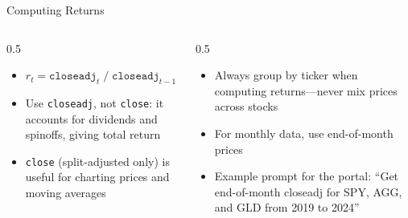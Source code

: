 \documentclass[aspectratio=169]{beamer}
\begin{document}
\begin{frame}{Computing Returns}
\begin{columns}[T]
\begin{column}{0.5\textwidth}
\begin{shadedbox}[title=\textbf{Monthly Returns from \texttt{closeadj}}]
\begin{itemize}\small
  \item $r_t = \texttt{closeadj}_t \;/\; \texttt{closeadj}_{t-1} - 1$
  \item Use \texttt{closeadj}, not \texttt{close}: it accounts for dividends and spinoffs, giving \alert{total return}
  \item \texttt{close} (split-adjusted only) is useful for charting prices and moving averages
\end{itemize}
\end{shadedbox}
\end{column}
\begin{column}{0.5\textwidth}
\begin{shadedbox}[title=\textbf{Important}]
\begin{itemize}\small
  \item Always \alert{group by ticker} when computing returns---never mix prices across stocks
  \item For monthly data, use end-of-month prices
  \item Example prompt for the portal: ``Get end-of-month closeadj for SPY, AGG, and GLD from 2019 to 2024''
\end{itemize}
\end{shadedbox}
\end{column}
\end{columns}
\end{frame}
\end{document}
